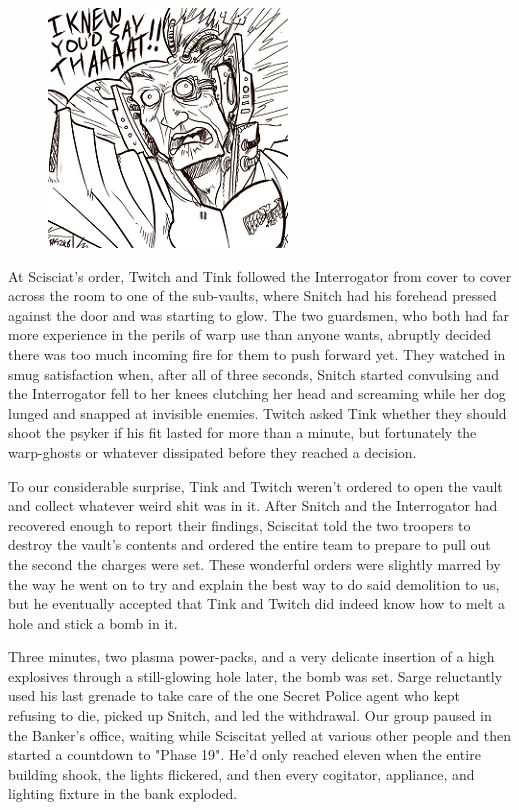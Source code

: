 \begin{figure}
	\begin{center}
		\includegraphics[width=\figwidth]{pics/18/34.png}
	\end{center}
\end{figure}
At Scisciat's order, Twitch and Tink followed the Interrogator from cover to cover across the room to one of the sub-vaults, where Snitch had his forehead pressed against the door and was starting to glow. 
The two guardsmen, who both had far more experience in the perils of warp use than anyone wants, abruptly decided there was too much incoming fire for them to push forward yet. 
They watched in smug satisfaction when, after all of three seconds, Snitch started convulsing and the Interrogator fell to her knees clutching her head and screaming while her dog lunged and snapped at invisible enemies. 
Twitch asked Tink whether they should shoot the psyker if his fit lasted for more than a minute, but fortunately the warp-ghosts or whatever dissipated before they reached a decision.

To our considerable surprise, Tink and Twitch weren't ordered to open the vault and collect whatever weird shit was in it. 
After Snitch and the Interrogator had recovered enough to report their findings, Sciscitat told the two troopers to destroy the vault's contents and ordered the entire team to prepare to pull out the second the charges were set. 
These wonderful orders were slightly marred by the way he went on to try and explain the best way to do said demolition to us, but he eventually accepted that Tink and Twitch did indeed know how to melt a hole and stick a bomb in it.

Three minutes, two plasma power-packs, and a very delicate insertion of a high explosives through a still-glowing hole later, the bomb was set. 
Sarge reluctantly used his last grenade to take care of the one Secret Police agent who kept refusing to die, picked up Snitch, and led the withdrawal. 
Our group paused in the Banker's office, waiting while Sciscitat yelled at various other people and then started a countdown to "Phase 19". 
He'd only reached eleven when the entire building shook, the lights flickered, and then every cogitator, appliance, and lighting fixture in the bank exploded.

